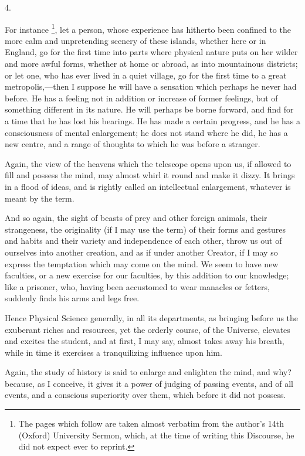 4.

For instance \footnote{The pages which follow are taken almost verbatim from the author's
14th (Oxford) University Sermon, which, at the time of writing this
Discourse, he did not expect ever to reprint.}, let a person, whose experience has hitherto been confined to
the more calm and unpretending scenery of these islands, whether
here or in England, go for the first time into parts where physical
nature puts on her wilder and more awful forms, whether at home or
abroad, as into mountainous districts; or let one, who has ever lived
in a quiet village, go for the first time to a great metropolis,—then
I suppose he will have a sensation which perhaps he never had before.
He has a feeling not in addition or increase of former feelings, but
of something different in its nature. He will perhaps be borne
forward, and find for a time that he has lost his bearings. He has
made a certain progress, and he has a consciousness of mental
enlargement; he does not stand where he did, he has a new centre, and
a range of thoughts to which he was before a stranger.

Again, the view of the heavens which the telescope opens upon us,
if allowed to fill and possess the mind, may almost whirl it round and
make it dizzy. It brings in a flood of ideas, and is rightly called an
intellectual enlargement, whatever is meant by the term.

And so again, the sight of beasts of prey and other foreign
animals, their strangeness, the originality (if I may use the term) of
their forms and gestures and habits and their variety and independence
of each other, throw us out of ourselves into another creation, and as
if under another Creator, if I may so express the temptation which may
come on the mind. We seem to have new faculties, or a new exercise for
our faculties, by this addition to our knowledge; like a prisoner,
who, having been accustomed to wear manacles or fetters, suddenly
finds his arms and legs free.

Hence Physical Science generally, in all its departments, as
bringing before us the exuberant riches and resources, yet the orderly
course, of the Universe, elevates and excites the student, and at
first, I may say, almost takes away his breath, while in time it
exercises a tranquilizing influence upon him.

Again, the study of history is said to enlarge and enlighten the
mind, and why? because, as I conceive, it gives it a power of judging
of passing events, and of all events, and a conscious superiority over
them, which before it did not possess.

